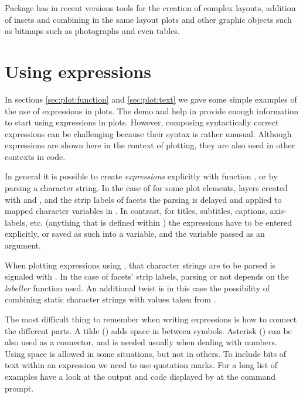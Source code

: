 \documentclass[krantz2]{krantz}\usepackage{knitr}
\begin{document}
Package  has in recent versions tools for the creation of complex layouts, addition of insets and combining in the same layout plots and other graphic objects such as bitmaps such as photographs and even tables.

\section[Using plotmath expressions]{Using  expressions}\label{sec:plot:plotmath}
In sections \ref{sec:plot:function} and \ref{sec:plot:text} we gave some simple examples of the use of \Rlang expressions in plots. The  demo and help in \Rlang provide enough information to start using expressions in plots. However, composing syntactically correct expressions can be challenging because their syntax is rather unusual. Although expressions are shown here in the context of plotting, they are also used in other contexts in \Rlang code.

In general it is possible to create \emph{expressions} explicitly with function , or by parsing a character string. In the case of \ggplot for some plot elements, layers created with  and , and the strip labels of facets the parsing is delayed and applied to mapped character variables in . In contrast, for titles, subtitles, captions, axis-labels, etc. (anything that is defined within ) the expressions have to be entered explicitly, or saved as such into a variable, and the variable passed as an argument.

When plotting expressions using , that character strings are to be parsed is signaled with . In the case of facets' strip labels, parsing or not depends on the \emph{labeller} function used. An additional twist is in this case the possibility of combining static character strings with values taken from .

The most difficult thing to remember when writing expressions is how to connect the different parts. A tilde (\code{\textasciitilde}) adds space in between symbols. Asterisk (\code{*}) can be also used as a connector, and is needed usually when dealing with numbers. Using space is allowed in some situations, but not in others. To include bits of text within an expression we need to use quotation marks. For a long list of examples have a look at the output and code displayed by  at the \Rlang command prompt.
\end{document}
